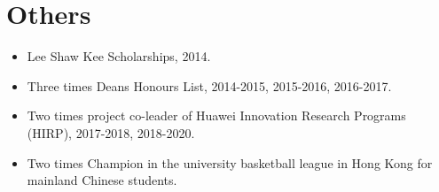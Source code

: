 \documentclass[a4paper,8pt]{article} %
\begin{document}
\section{Others}
\begin{itemize}
\item Lee Shaw Kee Scholarships, 2014.
\item Three times Deans Honours List, 2014-2015, 2015-2016, 2016-2017. 
\item Two times project co-leader of Huawei Innovation Research Programs (HIRP), 2017-2018, 2018-2020.
\item Two times Champion in the university basketball league in Hong Kong for mainland Chinese students.
\end{itemize}











\end{document}
